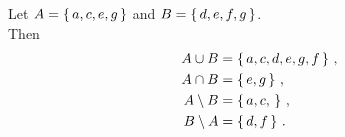 \guard





\begin{exmp}
\label{exmp:setOperations}
  Let $A=\left\{\,a,c,e,g\,\right\}$ and $B=\left\{\,d,e,f,g\,\right\}$.\\
  Then
  \begin{align*}
    A\cup B &= \left\{\, a,c,d,e,g,f\,\right\}\,, \\
    A\cap B &= \left\{\, e, g\,\right\}\,, \\
    A\setminus B &= \left\{\, a, c, \,\right\}\,, \\
    B\setminus A &= \left\{\, d, f \,\right\}\,.
  \end{align*}
\end{exmp}
